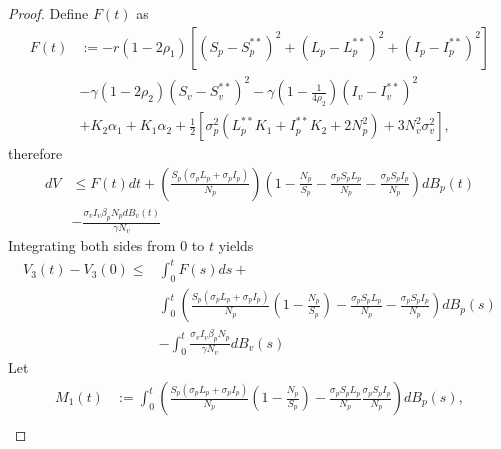 \begin{proof}
	Define $F(t)$ as
	\begin{align*}
		F(t)
			&:=
				-r 
				\left(
					1 - 2 \rho_1
				\right)
				\left[
					(S_p - S_p ^{**} ) ^ 2 + 
					(L_p - L_p ^{**} ) ^ 2 +
					(I_p - I_p ^{**} ) ^ 2
				\right]
		\\
			&-
				\gamma
				\left(
					1 - 2 \rho_2
				\right)
				(S_v - S_v^{**}) ^ 2 - 
				\gamma
				\left(
					1 - 
					\frac{1}{4\rho_2}
				\right)
				(I_v - I_v^{**}) ^ 2
		\\
			&+
				K_2 \alpha_1 + K_1
				\alpha_2 + 
				\frac{1}{2}
				\left[
					\sigma_p ^ 2
					( 
						L_p ^{**} K_1 + 
						I_p ^{**} K_2 + 
						2N_p ^2
					) + 
					3N_v ^ 2
					\sigma_v ^ 2
				\right],
	\end{align*}
%
	therefore
	\begin{align*}
		dV
			&\leq
				F(t)dt + 
				\left(
					\frac{
						S_p
						\left( 
							\sigma_p L_p + 
							\sigma_p I_p 
						\right)
					}{N_p}
				\right)
				\left(
					 1 - 
					 	\frac {N_p}{S_p} - 
				\frac{\sigma_p S_p L_p}{N_p} - 
				\frac{\sigma_p S_p I_p}{N_p}
				\right)
				 dB_p(t)
				\\
			&-
				\frac{\sigma_v I_v \beta_p N_p dB_v(t)}{\gamma N_v}
	\end{align*}
	Integrating both sides from 0 to $t$ yields
	\begin{align*}
	 	V_3(t) - 
	 	V_3(0)
	 	\leq
	 	&	
	 		\int_{0} ^ {t}
	 				F(s)ds +
	 		\\ 
	 		&
	 		\int_{0} ^ {t}
	 				\left(
	 					\frac{
	 						S_p 
	 						\left(
	 							\sigma_p L_p + 
	 							\sigma_p I_p 
	 						\right)
	 					}{N_p}
			 			\left(
			 				1 - 
			 				\frac{N_p}{S_p}
			 			\right) - 
			 				\frac{
			 					\sigma_p S_p L_p
			 				}{N_p}
			 			\right.
	 		-
	 			\left.
	 				\frac{
	 					\sigma_p S_p I_p
	 				}{N_p}
	 			\right)  
	 			dB_p(s)
	 		\\
	 		&
	 			-
	 			\int_{0} ^ {t}
	 				\frac{\sigma_v I_v \beta_p N_p}{\gamma N_v} dB_v(s)
	 \end{align*}
	Let 
	 \begin{align*}
	 	M_1(t)&:=
	 		\int_{0} ^ {t}
	 			\left( 
	 				\frac{
	 					S_p 
	 					\left(
	 						\sigma_p L_p + 
	 						\sigma_p I_p 
	 					\right)
	 				}{N_p}
	 				\left(
	 					1 - 
	 					\frac{N_p}{S_p}
	 				\right)
	 				- 
	 				\frac{
	 					\sigma_p S_p L_p
	 				}{N_p}
	 				\frac{\sigma_p S_p I_p}{N_p}
	 			\right) dB_p(s),
	 			\\

\end{align*}
\end{proof}
